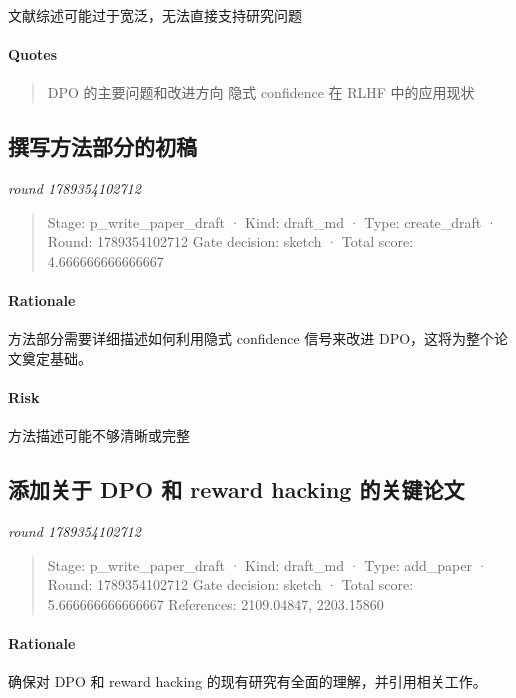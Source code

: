 \documentclass{article}
\begin{document}
文献综述可能过于宽泛，无法直接支持研究问题

\paragraph{Quotes}
\begin{quote}
DPO 的主要问题和改进方向
隐式 confidence 在 RLHF 中的应用现状
\end{quote}

\subsection{撰写方法部分的初稿}
\textit{round 1789354102712}\\
\begin{quote}
Stage: p\_write\_paper\_draft  ·  Kind: draft\_md  ·  Type: create\_draft  ·  Round: 1789354102712
Gate decision: sketch  ·  Total score: 4.666666666666667
\end{quote}

\paragraph{Rationale}

方法部分需要详细描述如何利用隐式 confidence 信号来改进 DPO，这将为整个论文奠定基础。

\paragraph{Risk}

方法描述可能不够清晰或完整

\subsection{添加关于 DPO 和 reward hacking 的关键论文}
\textit{round 1789354102712}\\
\begin{quote}
Stage: p\_write\_paper\_draft  ·  Kind: draft\_md  ·  Type: add\_paper  ·  Round: 1789354102712
Gate decision: sketch  ·  Total score: 5.666666666666667
References: 2109.04847, 2203.15860
\end{quote}

\paragraph{Rationale}

确保对 DPO 和 reward hacking 的现有研究有全面的理解，并引用相关工作。
\end{document}
